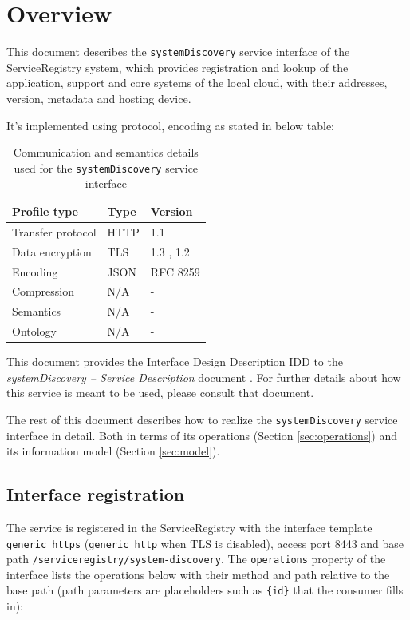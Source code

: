 \documentclass[a4paper]{arrowhead}
\begin{document}
\section{Overview}
\label{sec:overview}

This document describes the \texttt{systemDiscovery} service interface of the ServiceRegistry system, which provides registration and lookup of the application, support and core systems of the local cloud, with their addresses, version, metadata and hosting device.

It's implemented using protocol, encoding as stated in below table:
\begin{table}[ht!]
  \centering
  \begin{tabular}{|l|l|l|}
    \hline
    \rowcolor{gray!33} Profile type & Type & Version \\ \hline
    Transfer protocol & HTTP & 1.1 \cite{rfc9112} \\ \hline
    Data encryption & TLS & 1.3 \cite{rfc8446}, 1.2 \cite{rfc5246} \\ \hline
    Encoding & JSON & RFC 8259 \cite{rfc8259} \\ \hline
    Compression & N/A & - \\ \hline
    Semantics & N/A & - \\ \hline
    Ontology & N/A & - \\ \hline
  \end{tabular}
  \caption{Communication and semantics details used for the \texttt{systemDiscovery} service interface}
  \label{tab:comunication_semantics_profile}
\end{table}

This document provides the Interface Design Description IDD to the \textit{systemDiscovery -- Service Description} document \cite{sr-systemDiscovery-sd}.
For further details about how this service is meant to be used, please consult that document.

The rest of this document describes how to realize the \texttt{systemDiscovery} service
interface in detail. Both in terms of its operations (Section \ref{sec:operations}) and its information model (Section \ref{sec:model}).

\subsection{Interface registration}

The service is registered in the ServiceRegistry with the interface template \texttt{generic\_\allowbreak{}https} (\texttt{generic\_\allowbreak{}http} when TLS is disabled), access port 8443 and base path \texttt{/\allowbreak{}serviceregistry/\allowbreak{}system-\allowbreak{}discovery}. The \texttt{operations} property of the interface lists the operations below with their method and path relative to the base path (path parameters are placeholders such as \texttt{\{id\}} that the consumer fills in):
\end{document}
